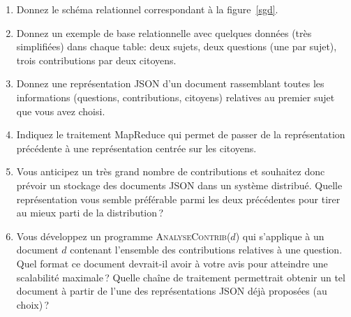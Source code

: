 \documentclass[11pt,a4paper]{article}
\begin{document}
\begin{enumerate}
  \item Donnez le schéma relationnel correspondant à la figure~\ref{sgd}. 
  \item Donnez un exemple de base relationnelle avec quelques données (très simplifiées) dans chaque table: deux sujets,
      deux questions (une par sujet), trois contributions par deux citoyens. 
      
   \item Donnez une représentation JSON d'un document rassemblant toutes les informations
        (questions, contributions, citoyens) relatives au premier sujet que vous avez choisi.
        
    
    \item Indiquez le traitement MapReduce qui permet de passer de la représentation
          précédente à une représentation centrée sur les citoyens.
     
     \item Vous anticipez un très grand nombre de contributions et souhaitez
        donc prévoir un stockage des documents JSON dans un système distribué. Quelle représentation
        vous semble préférable parmi les deux précédentes pour tirer au mieux parti de la distribution\,? 
        
      \item Vous développez un programme \textsc{AnalyseContrib($d$)} qui s'applique à  un
         document $d$ contenant l'ensemble des contributions
          relatives à une question. Quel format ce document devrait-il avoir à
          votre avis pour atteindre une scalabilité maximale\,? 
          Quelle chaîne de traitement permettrait obtenir un tel document
          à partir de l'une des représentations JSON déjà proposées (au choix)\,?
\end{enumerate}
\end{document}
